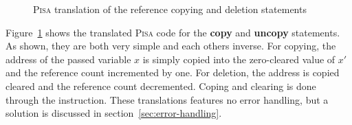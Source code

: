 \begin{figure}[H]
\begin{subfigure}[t]{0.495\linewidth}
    \end{subfigure}
    
    \caption{\textsc{Pisa} translation of the reference copying and deletion statements}
    \label{fig:pisa-referencing}
\end{figure}

Figure~\ref{fig:pisa-referencing} shows the translated \textsc{Pisa} code for the \textbf{copy} and \textbf{uncopy} statements. As shown, they are both very simple and each others inverse. For copying, the address of the passed variable $x$ is simply copied into the zero-cleared value of $x'$ and the reference count incremented by one. For deletion, the address is copied cleared and the reference count decremented. Coping and clearing is done through the  instruction. These translations features no error handling, but a solution is discussed in section~\ref{sec:error-handling}.


